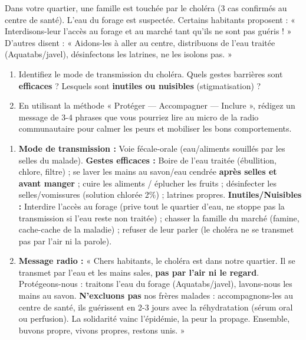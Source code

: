 \documentclass[11pt]{article}
\begin{document}
\begin{exercice}
Dans votre quartier, une famille est touchée par le choléra (3 cas confirmés au centre de santé). L'eau du forage est suspectée. Certains habitants proposent : « Interdisons-leur l'accès au forage et au marché tant qu'ils ne sont pas guéris ! » D'autres disent : « Aidons-les à aller au centre, distribuons de l'eau traitée (Aquatabs/javel), désinfectons les latrines, ne les isolons pas. »
\begin{enumerate}
    \item Identifiez le mode de transmission du choléra. Quels gestes barrières sont \textbf{efficaces} ? Lesquels sont \textbf{inutiles ou nuisibles} (stigmatisation) ?
    \item En utilisant la méthode « Protéger — Accompagner — Inclure », rédigez un message de 3-4 phrases que vous pourriez lire au micro de la radio communautaire pour calmer les peurs et mobiliser les bons comportements.
\end{enumerate}
\end{exercice}

\begin{corrige}
\begin{enumerate}
    \item \textbf{Mode de transmission :} Voie fécale-orale (eau/aliments souillés par les selles du malade). \textbf{Gestes efficaces :} Boire de l'eau traitée (ébullition, chlore, filtre) ; se laver les mains au savon/eau cendrée \textbf{après selles et avant manger} ; cuire les aliments / éplucher les fruits ; désinfecter les selles/vomissures (solution chlorée 2\%) ; latrines propres. \textbf{Inutiles/Nuisibles :} Interdire l'accès au forage (prive tout le quartier d'eau, ne stoppe pas la transmission si l'eau reste non traitée) ; chasser la famille du marché (famine, cache-cache de la maladie) ; refuser de leur parler (le choléra ne se transmet pas par l'air ni la parole).
    \item \textbf{Message radio :} « Chers habitants, le choléra est dans notre quartier. Il se transmet par l'eau et les mains sales, \textbf{pas par l'air ni le regard}. Protégeons-nous : traitons l'eau du forage (Aquatabs/javel), lavons-nous les mains au savon. \textbf{N'excluons pas} nos frères malades : accompagnons-les au centre de santé, ils guérissent en 2-3 jours avec la réhydratation (sérum oral ou perfusion). La solidarité vainc l'épidémie, la peur la propage. Ensemble, buvons propre, vivons propres, restons unis. »
\end{enumerate}
\end{corrige}
\end{document}
